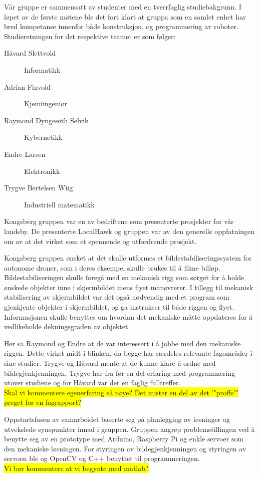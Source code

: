 Vår gruppe er sammensatt av studenter med en tverrfaglig studiebakgrunn. I løpet av de første møtene ble det fort klart at gruppa som en samlet enhet har bred kompetanse innenfor både konstruksjon, og programmering av roboter. Studieretningen for det respektive teamet er som følger:

\begin{description}
	\item[Håvard Slettvold] Informatikk
	\item[Adrian Finvold] Kjemiingeniør
	\item[Raymond Dyngeseth Selvik] Kybernetikk
	\item[Endre Larsen] Elektronikk
	\item[Trygve Bertelsen Wiig] Industriell matematikk
\end{description}

Kongsberg gruppen var en av bedriftene som presenterte prosjekter for vår landsby. De presenterte LocalHawk og gruppen var av den generelle oppfatningen om av at det virket som et spennende og utfordrende prosjekt. 

Kongsberg gruppen ønsket at det skulle utformes et bildestabiliseringssystem for autonome droner, som i deres eksempel skulle brukes til å filme billøp. Bildestabiliseringen skulle foregå med en mekanisk rigg som sørget for å holde ønskede objekter inne i skjermbildet mens flyet manøvrerer. I tillegg til mekanisk stabilisering av skjermbildet var det også nødvendig med et program som gjenkjente objekter i skjermbildet, og ga instrukser til både riggen og flyet. Informasjonen skulle benyttes om hvordan det mekaniske måtte oppdateres for å vedlikeholde dekningsgraden av objektet. 

Her sa Raymond og Endre at de var interessert i å jobbe med den mekaniske riggen. Dette virket midt i blinken, da begge har særdeles relevante fagområder i sine studier. Trygve og Håvard mente at de kunne klare å ordne med bildegjenkjenningen, Trygve har fra før en del erfaring med programmering utover studiene og for Håvard var det en faglig fulltreffer. \\\colorbox{yellow}{Skal vi kommentere egenerfaring så nøye? Det mister en del av det '"proffe'" preget for en fagrapport?}

Oppstartsfasen av samarbeidet baserte seg på planlegging av løsninger og utvekslede synspunkter innad i gruppen. Gruppen angrep problemstillingen ved å benytte seg av en prototype med Arduino, Raspberry Pi og enkle servoer som den mekaniske løsningen. For styringen av bildegjenkjenningen og styringen av servoen ble og OpenCV og C++ benyttet til programmeringen. \\\colorbox{yellow}{Vi bør kommentere at vi begynte med matlab?}
